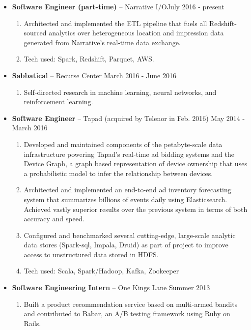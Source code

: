 \documentclass[11pt]{article}
\begin{document}
\begin{itemize}[leftmargin=12pt]
  \item[] \textbf{Software Engineer (part-time)} -- Narrative I/O\hfill July 2016 - present
    \begin{enumerate}[leftmargin=2em,labelindent=16pt,label=$\bullet$]
      \item Architected and implemented the ETL pipeline that fuels all Redshift-sourced analytics over heterogeneous location and impression data generated from Narrative's real-time data exchange.
      \item Tech used: Spark, Redshift, Parquet, AWS.
    \end{enumerate}
  \item[] \textbf{Sabbatical} -- Recurse Center \hfill March 2016 - June 2016
    \begin{enumerate}[leftmargin=2em,labelindent=16pt,label=$\bullet$]
      \item Self-directed research in machine learning, neural networks, and reinforcement learning.
    \end{enumerate}
  \item[] \textbf{Software Engineer} -- Tapad (acquired by Telenor in Feb. 2016) \hfill May 2014 - March 2016 
    \begin{enumerate}[leftmargin=2em,labelindent=16pt,label=$\bullet$]
      \item Developed and maintained components of the petabyte-scale data infrastructure powering Tapad's real-time ad bidding systems and the Device Graph, a graph based representation of device ownership that uses a probabilistic model to infer the relationship between devices. 
      \item Architected and implemented an end-to-end ad inventory forecasting system that summarizes billions of events daily using Elasticsearch. Achieved vastly superior results over the previous system in terms of both accuracy and speed.
      \item Configured and benchmarked several cutting-edge, large-scale analytic data stores (Spark-sql, Impala, Druid) as part of project to improve access to unstructured data stored in HDFS. 
      \item Tech used: Scala, Spark/Hadoop, Kafka, Zookeeper
    \end{enumerate}
  \item[] \textbf{Software Engineering Intern} -- One Kings Lane \hfill Summer 2013 
    \begin{enumerate}[leftmargin=2em,labelindent=16pt,label=$\bullet$]
      \item Built a product recommendation service based on multi-armed bandits and contributed to Babar, an A/B testing framework using Ruby on Rails.
    \end{enumerate}


\end{itemize}
\end{document}
